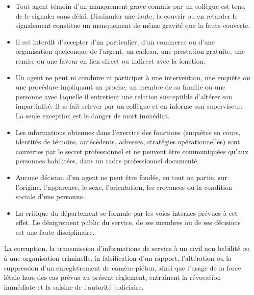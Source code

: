
\begin{itemize}
  \item {} Tout agent témoin d'un manquement grave commis par un collègue est tenu de le signaler sans délai. Dissimuler une faute, la couvrir ou en retarder le signalement constitue un manquement de même gravité que la faute couverte.
  \item {} Il est interdit d'accepter d'un particulier, d'un commerce ou d'une organisation quelconque de l'argent, un cadeau, une prestation gratuite, une remise ou une faveur en lien direct ou indirect avec la fonction.
  \item {} Un agent ne peut ni conduire ni participer à une intervention, une enquête ou une procédure impliquant un proche, un membre de sa famille ou une personne avec laquelle il entretient une relation susceptible d'altérer son impartialité. Il se fait relever par un collègue et en informe son superviseur. La seule exception est le danger de mort immédiat.
  \item {} Les informations obtenues dans l'exercice des fonctions (enquêtes en cours, identités de témoins, antécédents, adresses, stratégies opérationnelles) sont couvertes par le secret professionnel et ne peuvent être communiquées qu'aux personnes habilitées, dans un cadre professionnel documenté.
  \item {} Aucune décision d'un agent ne peut être fondée, en tout ou partie, sur l'origine, l'apparence, le sexe, l'orientation, les croyances ou la condition sociale d'une personne.
  \item {} La critique du département se formule par les voies internes prévues à cet effet. Le dénigrement public du service, de ses membres ou de ses décisions est une faute disciplinaire.
\end{itemize}

\begin{interdit}
La corruption, la transmission d'informations de service à un civil non habilité ou à une organisation criminelle, la falsification d'un rapport, l'altération ou la suppression d'un enregistrement de caméra-piéton, ainsi que l'usage de la force létale hors des cas prévus au présent règlement, entraînent la révocation immédiate et la saisine de l'autorité judiciaire.
\end{interdit}

\clearpage
